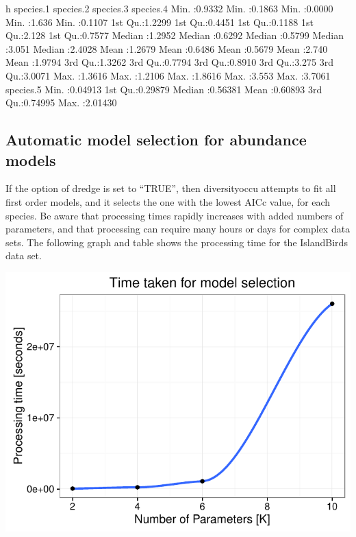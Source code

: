 \documentclass[article]{jss}
\begin{document}
\begin{CodeChunk}
\begin{CodeOutput}
       h            species.1        species.2        species.3       species.4     
 Min.   :0.9332   Min.   :0.1863   Min.   :0.0000   Min.   :1.636   Min.   :0.1107  
 1st Qu.:1.2299   1st Qu.:0.4451   1st Qu.:0.1188   1st Qu.:2.128   1st Qu.:0.7577  
 Median :1.2952   Median :0.6292   Median :0.5799   Median :3.051   Median :2.4028  
 Mean   :1.2679   Mean   :0.6486   Mean   :0.5679   Mean   :2.740   Mean   :1.9794  
 3rd Qu.:1.3262   3rd Qu.:0.7794   3rd Qu.:0.8910   3rd Qu.:3.275   3rd Qu.:3.0071  
 Max.   :1.3616   Max.   :1.2106   Max.   :1.8616   Max.   :3.553   Max.   :3.7061  
   species.5      
 Min.   :0.04913  
 1st Qu.:0.29879  
 Median :0.56381  
 Mean   :0.60893  
 3rd Qu.:0.74995  
 Max.   :2.01430  
\end{CodeOutput}
\end{CodeChunk}

\subsection{Automatic model selection for abundance
models}\label{automatic-model-selection-for-abundance-models}

If the option of dredge is set to ``TRUE'', then diversityoccu attempts
to fit all first order models, and it selects the one with the lowest
AICc value, for each species. Be aware that processing times rapidly
increases with added numbers of parameters, and that processing can
require many hours or days for complex data sets. The following graph
and table shows the processing time for the IslandBirds data set.

\begin{CodeChunk}


\begin{center}\includegraphics{diversityocc_files/figure-latex/unnamed-chunk-13-1} \end{center}

\end{CodeChunk}
\end{document}

